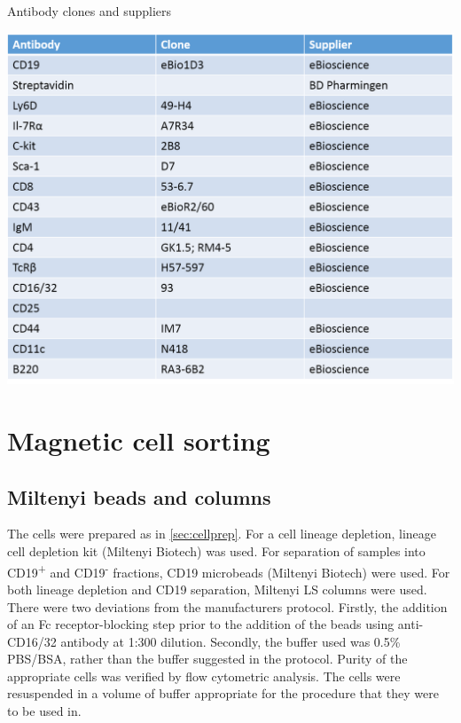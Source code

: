 \begin{table}
\caption{Antibody clones and suppliers}
\includegraphics[width=\textwidth]{Figures/Antibodyclones.png}

\label{fig:antibodyclones}
\end{table}

\section{Magnetic cell sorting}
\label{Methods:MACSdepletion}

\subsection{Miltenyi beads and columns}
\label{subsec:Miltenyibeads}

The cells were prepared as in \cref{sec:cellprep}.
For a cell lineage depletion, lineage cell depletion kit (Miltenyi Biotech) was used.
For separation of samples into CD19\textsuperscript{+} and CD19\textsuperscript{-} fractions, CD19 microbeads (Miltenyi Biotech) were used.
For both lineage depletion and CD19 separation, Miltenyi LS columns were used. %
There were two deviations from the manufacturers protocol.
Firstly, the addition of an Fc receptor-blocking step prior to the addition of the beads using anti-CD16/32 antibody at 1:300 dilution.
Secondly, the buffer used was 0.5\% PBS/BSA, rather than the buffer suggested in the protocol.
Purity of the appropriate cells was verified by flow cytometric analysis.
The cells were resuspended in a volume of buffer appropriate for the procedure that they were to be used in.

